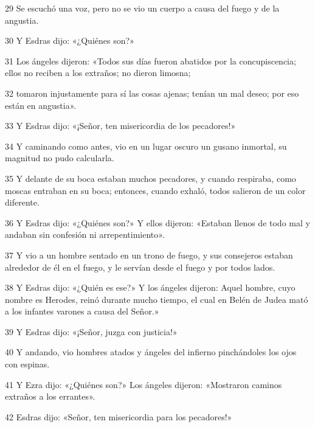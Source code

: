 \par 29 Se escuchó una voz, pero no se vio un cuerpo a causa del fuego y de la angustia.

\par 30 Y Esdras dijo: «¿Quiénes son?» 

\par 31 Los ángeles dijeron: «Todos sus días fueron abatidos por la concupiscencia; ellos no reciben a los extraños; no dieron limosna;

\par 32 tomaron injustamente para sí las cosas ajenas; tenían un mal deseo; por eso están en angustia».

\par 33 Y Esdras dijo: «¡Señor, ten misericordia de los pecadores!»

\par 34 Y caminando como antes, vio en un lugar oscuro un gusano inmortal, su magnitud no pudo calcularla.

\par 35 Y delante de su boca estaban muchos pecadores, y cuando respiraba, como moscas entraban en su boca; entonces, cuando exhaló, todos salieron de un color diferente.

\par 36 Y Esdras dijo: «¿Quiénes son?» Y ellos dijeron: «Estaban llenos de todo mal y andaban sin confesión ni arrepentimiento».

\par 37 Y vio a un hombre sentado en un trono de fuego, y sus consejeros estaban alrededor de él en el fuego, y le servían desde el fuego y por todos lados.

\par 38 Y Esdras dijo: «¿Quién es ese?» Y los ángeles dijeron: Aquel hombre, cuyo nombre es Herodes, reinó durante mucho tiempo, el cual en Belén de Judea mató a los infantes varones a causa del Señor.»

\par 39 Y Esdras dijo: «¡Señor, juzga con justicia!»

\par 40 Y andando, vio hombres atados y ángeles del infierno pinchándoles los ojos con espinas.

\par 41 Y Ezra dijo: «¿Quiénes son?» Los ángeles dijeron: «Mostraron caminos extraños a los errantes».

\par 42 Esdras dijo: «Señor, ten misericordia para los pecadores!»

